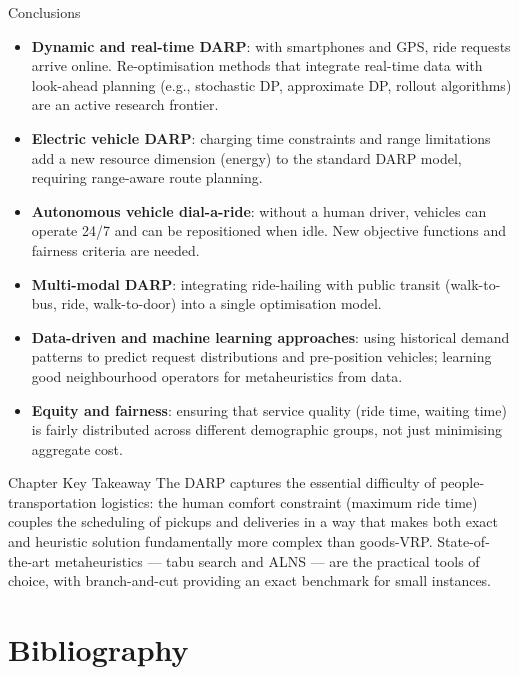 \documentclass[aspectratio=169,10pt]{beamer}
\begin{document}
\begin{frame}[allowframebreaks]{Conclusions}
  \begin{itemize}
    \item \textbf{Dynamic and real-time DARP}: with smartphones and GPS,
          ride requests arrive online.  Re-optimisation methods that integrate
          real-time data with look-ahead planning (e.g., stochastic DP,
          approximate DP, rollout algorithms) are an active research frontier.
    \item \textbf{Electric vehicle DARP}: charging time constraints and
          range limitations add a new resource dimension (energy) to the
          standard DARP model, requiring range-aware route planning.
    \item \textbf{Autonomous vehicle dial-a-ride}: without a human driver,
          vehicles can operate 24/7 and can be repositioned when idle.
          New objective functions and fairness criteria are needed.
    \item \textbf{Multi-modal DARP}: integrating ride-hailing with public
          transit (walk-to-bus, ride, walk-to-door) into a single
          optimisation model.
    \item \textbf{Data-driven and machine learning approaches}: using
          historical demand patterns to predict request distributions and
          pre-position vehicles; learning good neighbourhood operators for
          metaheuristics from data.
    \item \textbf{Equity and fairness}: ensuring that service quality
          (ride time, waiting time) is fairly distributed across different
          demographic groups, not just minimising aggregate cost.
  \end{itemize}

  \begin{alertblock}{Chapter Key Takeaway}
    The DARP captures the essential difficulty of people-transportation
    logistics: the human comfort constraint (maximum ride time) couples
    the scheduling of pickups and deliveries in a way that makes both exact
    and heuristic solution fundamentally more complex than goods-VRP.
    State-of-the-art metaheuristics — tabu search and ALNS — are the
    practical tools of choice, with branch-and-cut providing an exact
    benchmark for small instances.
  \end{alertblock}

\end{frame}

\section{Bibliography}
\end{document}
